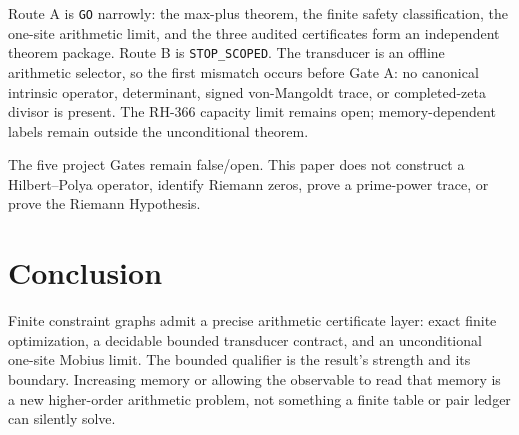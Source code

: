\documentclass[11pt]{article}
\theoremstyle{definition}
\theoremstyle{remark}
\begin{document}
Route A is \texttt{GO} narrowly: the max-plus theorem, the finite safety
classification, the one-site arithmetic limit, and the three audited
certificates form an independent theorem package.  Route B is
\texttt{STOP\_SCOPED}.  The transducer is an offline arithmetic selector, so
the first mismatch occurs before Gate A: no canonical intrinsic operator,
determinant, signed von-Mangoldt trace, or completed-zeta divisor is present.
The RH-366 capacity limit remains open; memory-dependent labels remain
outside the unconditional theorem.

The five project Gates remain false/open.  This paper does not construct a
Hilbert--Polya operator, identify Riemann zeros, prove a prime-power trace, or
prove the Riemann Hypothesis.

\section{Conclusion}

Finite constraint graphs admit a precise arithmetic certificate layer: exact
finite optimization, a decidable bounded transducer contract, and an
unconditional one-site Mobius limit.  The bounded qualifier is the result's
strength and its boundary.  Increasing memory or allowing the observable to
read that memory is a new higher-order arithmetic problem, not something a
finite table or pair ledger can silently solve.



\end{document}
